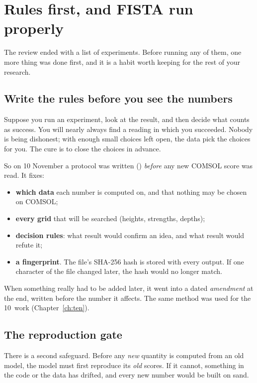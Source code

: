 \chapter{Rules first, and FISTA run properly}\label{ch:fista_depth}

The review ended with a list of experiments. Before running any of them, one more thing was done first, and it is a
habit worth keeping for the rest of your research.

\section{Write the rules before you see the numbers}

Suppose you run an experiment, look at the result, and then decide what counts as success. You will nearly always find
a reading in which you succeeded. Nobody is being dishonest; with enough small choices left open, the data pick the
choices for you. The cure is to close the choices in advance.

So on 10 November a protocol was written () \emph{before} any new COMSOL score was read. It
fixes:
\begin{itemize}
\item \textbf{which data} each number is computed on, and that nothing may be chosen on COMSOL;
\item \textbf{every grid} that will be searched (heights, strengths, depths);
\item \textbf{decision rules}: what result would confirm an idea, and what result would refute it;
\item \textbf{a fingerprint}. The file's SHA-256 hash is stored with every output. If one character of the file changed
later, the hash would no longer match.
\end{itemize}
When something really had to be added later, it went into a dated \emph{amendment} at the end, written before the number
it affects. The same method was used for the 10\um\ work (Chapter~\ref{ch:ten}).

\section{The reproduction gate}

There is a second safeguard. Before any \emph{new} quantity is computed from an old model, the model must first
reproduce its \emph{old} scores. If it cannot, something in the code or the data has drifted, and every new number would
be built on sand.

